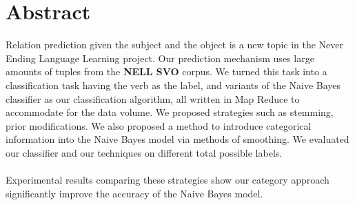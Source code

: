\section*{Abstract}

Relation prediction given the subject and the object is a new topic in the Never Ending Language Learning project. Our prediction mechanism uses large amounts of tuples from the \textbf{NELL SVO} corpus. We turned this task into a classification task having the verb as the label, and variants of the Naive Bayes classifier as our classification algorithm, all written in Map Reduce to accommodate for the data volume. We proposed strategies such as stemming, prior modifications. We also proposed a method to introduce categorical information into the Naive Bayes model via methods of smoothing. We evaluated our classifier and our techniques on different total possible labels.\\
\\
Experimental results comparing these strategies show our category approach significantly improve the accuracy of the Naive Bayes model.

